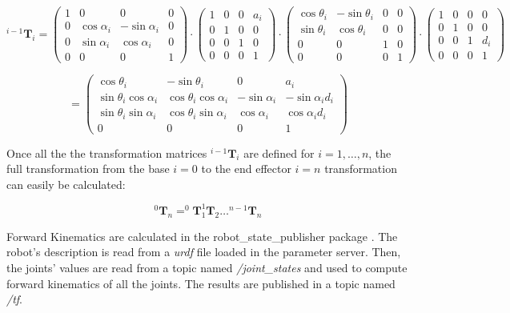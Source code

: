 $$
^{i-1}\mathbf{T}_{i} =
\left(\begin{array}{cccc}
1 & 0 & 0 & 0 \\
0 & \cos \alpha_{i} & - \sin \alpha_{i} & 0 \\
0 & \sin \alpha_{i} & \cos \alpha_{i} & 0 \\
0 & 0 & 0 & 1
\end{array}\right) \cdot
\left(\begin{array}{cccc}
1 & 0 & 0 & a_{i} \\
0 & 1 & 0 & 0 \\
0 & 0 & 1 & 0 \\
0 & 0 & 0 & 1
\end{array}\right) \cdot
\left(\begin{array}{cccc}
\cos \theta_{i} & - \sin \theta_{i} & 0 & 0 \\
\sin \theta_{i} & \cos \theta_{i} & 0 & 0 \\
0 & 0 & 1 & 0 \\
0 & 0 & 0 & 1
\end{array}\right) \cdot
\left(\begin{array}{cccc}
1 & 0 & 0 & 0 \\
0 & 1 & 0 & 0 \\
0 & 0 & 1 & d_{i} \\
0 & 0 & 0 & 1
\end{array}\right)
$$

$$
=
\left(\begin{array}{cccc}
\cos \theta_{i} & -\sin \theta_{i} & 0 & a_{i} \\
\sin \theta_{i} \cos \alpha_{i} & \cos \theta_{i} \cos \alpha_{i} & -\sin \alpha_{i} & -\sin \alpha_{i} d_{i} \\
\sin \theta_{i} \sin \alpha_{i} & \cos \theta_{i} \sin \alpha_{i} & \cos \alpha_{i} & \cos \alpha_{i} d_{i} \\
0 & 0 & 0 & 1
\end{array}\right)
$$

Once all the the transformation matrices $^{i-1}\mathbf{T}_{i}$ are defined for $i = 1,  \dots, n$, the full transformation from the base $i=0$ to the end effector $i=n$ transformation can easily be calculated:

$$
^{0}\mathbf{T}_{n} = ^{0}\mathbf{T}_{1} ^{1}\mathbf{T}_{2} \dots ^{n-1}\mathbf{T}_{n}
$$

Forward Kinematics are calculated in the robot\_state\_publisher package \cite{rosstatepublisher}. The robot's description is read from a \textit{urdf} file loaded in the parameter server. Then, the joints' values are read from a topic named \textit{/joint\_states} and used to compute forward kinematics of all the joints. The results are published in a topic named \textit{/tf}.

